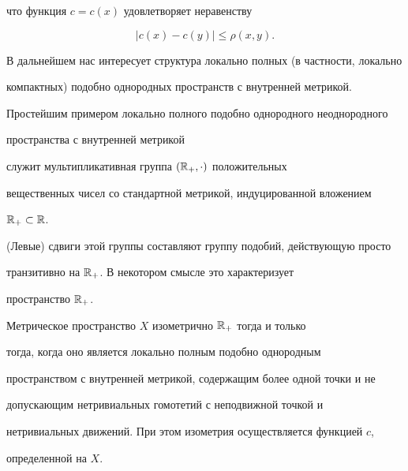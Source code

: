 что функция $c = c(x)$ удовлетворяет неравенству


\begin{equation}


\label{c}


|c(x)-c(y)| \leq \rho (x,y).


\end{equation}





В дальнейшем нас интересует структура локально полных (в частности, локально


компактных) подобно однородных пространств с внутренней метрикой.





\begin{exams}


\label{ex1}


Простейшим примером локально полного подобно однородного неоднородного


пространства с внутренней метрикой


служит мультипликативная группа $(\Bbb{R}_{+},\cdot)$ положительных


вещественных чисел со стандартной метрикой, индуцированной вложением


$\Bbb{R}_{+} \subset \Bbb{R}$.


(Левые) сдвиги этой группы составляют группу подобий, действующую просто


транзитивно на $\Bbb{R}_{+}$. В некотором смысле это характеризует


пространство $\Bbb{R}_{+}$.


\end{exams}








\begin{thms}


\label{R}


Метрическое пространство $X$ изометрично $\Bbb{R}_{+}$ тогда и только


тогда, когда оно является локально полным подобно однородным


пространством с внутренней метрикой, содержащим более одной точки и не


допускающим нетривиальных гомотетий с неподвижной точкой и


нетривиальных движений. При этом изометрия осуществляется функцией $c$,


определенной на $X$.


\end{thms}






